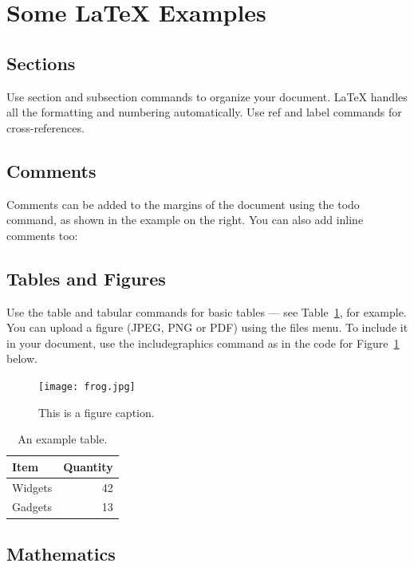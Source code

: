 \documentclass[12pt]{article}
\begin{document}
\newpage

\section{Some \LaTeX{} Examples}
\label{sec:examples}

\subsection{Sections}

Use section and subsection commands to organize your document. \LaTeX{} handles all the formatting and numbering automatically. Use ref and label commands for cross-references.

\subsection{Comments}

Comments can be added to the margins of the document using the  todo command, as shown in the example on the right. You can also add inline comments too:


\subsection{Tables and Figures}

Use the table and tabular commands for basic tables --- see Table~\ref{tab:widgets}, for example. You can upload a figure (JPEG, PNG or PDF) using the files menu. To include it in your document, use the includegraphics command as in the code for Figure~\ref{fig:frog} below.

\begin{figure}
\centering
\texttt{[image: frog.jpg]}
\caption{\label{fig:frog}This is a figure caption.}
\end{figure}

\begin{table}
\centering
\begin{tabular}{l|r}
Item & Quantity \\\hline
Widgets & 42 \\
Gadgets & 13
\end{tabular}
\caption{\label{tab:widgets}An example table.}
\end{table}

\subsection{Mathematics}
\end{document}

